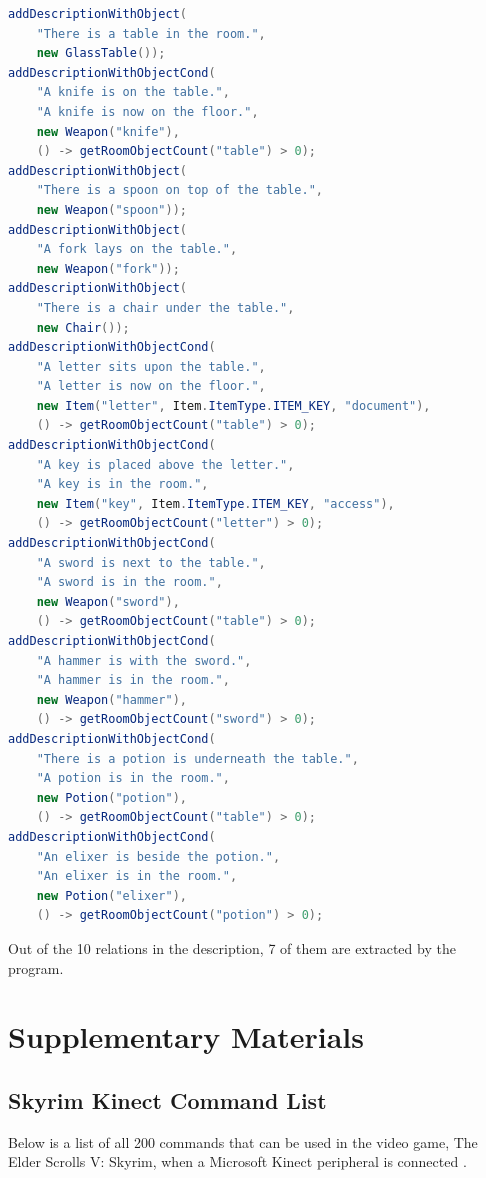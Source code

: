 \documentclass[11pt]{article}
\begin{document}
\begin{appendices}
\begin{lstlisting}[language=Java]
addDescriptionWithObject(
    "There is a table in the room.",
    new GlassTable());
addDescriptionWithObjectCond(
    "A knife is on the table.",
    "A knife is now on the floor.",
    new Weapon("knife"),
    () -> getRoomObjectCount("table") > 0);
addDescriptionWithObject(
    "There is a spoon on top of the table.",
    new Weapon("spoon"));
addDescriptionWithObject(
    "A fork lays on the table.",
    new Weapon("fork"));
addDescriptionWithObject(
    "There is a chair under the table.",
    new Chair());
addDescriptionWithObjectCond(
    "A letter sits upon the table.",
    "A letter is now on the floor.",
    new Item("letter", Item.ItemType.ITEM_KEY, "document"),
    () -> getRoomObjectCount("table") > 0);
addDescriptionWithObjectCond(
    "A key is placed above the letter.",
    "A key is in the room.",
    new Item("key", Item.ItemType.ITEM_KEY, "access"),
    () -> getRoomObjectCount("letter") > 0);
addDescriptionWithObjectCond(
    "A sword is next to the table.",
    "A sword is in the room.",
    new Weapon("sword"),
    () -> getRoomObjectCount("table") > 0);
addDescriptionWithObjectCond(
    "A hammer is with the sword.",
    "A hammer is in the room.",
    new Weapon("hammer"),
    () -> getRoomObjectCount("sword") > 0);
addDescriptionWithObjectCond(
    "There is a potion is underneath the table.",
    "A potion is in the room.",
    new Potion("potion"),
    () -> getRoomObjectCount("table") > 0);
addDescriptionWithObjectCond(
    "An elixer is beside the potion.",
    "An elixer is in the room.",
    new Potion("elixer"),
    () -> getRoomObjectCount("potion") > 0);
\end{lstlisting}

Out of the 10 relations in the description, 7 of them are extracted by the program.

\newpage
\section{Supplementary Materials}
\subsection{Skyrim Kinect Command List}
\label{appendix:skyrim}
Below is a list of all 200 commands that can be used in the video game, The Elder Scrolls V: Skyrim, when a Microsoft Kinect peripheral is connected \cite{RefWorks:24}.


\end{appendices}
\end{document}

